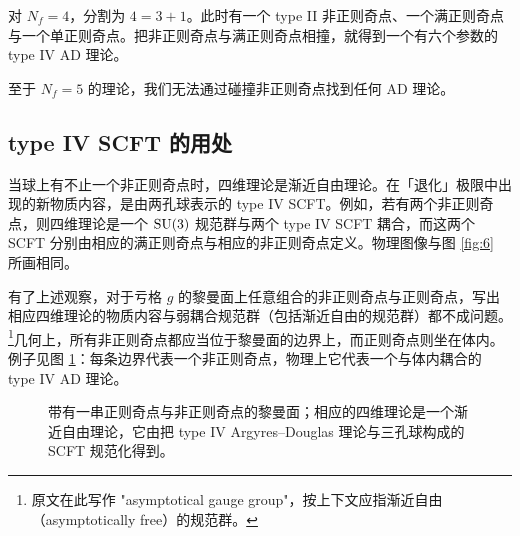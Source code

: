 对 $N_f=4$，分割为 $4 = 3+1$。此时有一个 type II 非正则奇点、一个满正则奇点与一个单正则奇点。把非正则奇点与满正则奇点相撞，就得到一个有六个参数的 type IV AD 理论。

至于 $N_f=5$ 的理论，我们无法通过碰撞非正则奇点找到任何 AD 理论。

\subsection{type IV SCFT 的用处}
\label{sec:5.5}

当球上有不止一个非正则奇点时，四维理论是渐近自由理论。在「退化」极限中出现的新物质内容，是由两孔球表示的 type IV SCFT。例如，若有两个非正则奇点，则四维理论是一个 $\operatorname{SU}(3)$ 规范群与两个 type IV SCFT 耦合，而这两个 SCFT 分别由相应的满正则奇点与相应的非正则奇点定义。物理图像与图 \ref{fig:6} 所画相同。

有了上述观察，对于亏格 $g$ 的黎曼面上任意组合的非正则奇点与正则奇点，写出相应四维理论的物质内容与弱耦合规范群（包括渐近自由的规范群）都不成问题。\footnote{原文在此写作 "asymptotical gauge group"，按上下文应指渐近自由（asymptotically free）的规范群。}几何上，所有非正则奇点都应当位于黎曼面的边界上，而正则奇点则坐在体内。例子见图 \ref{fig:11}：每条边界代表一个非正则奇点，物理上它代表一个与体内耦合的 type IV AD 理论。

\begin{figure}[tbp]
\centering

\caption{带有一串正则奇点与非正则奇点的黎曼面；相应的四维理论是一个渐近自由理论，它由把 type IV Argyres--Douglas 理论与三孔球构成的 SCFT 规范化得到。}
\label{fig:11}
\end{figure}

